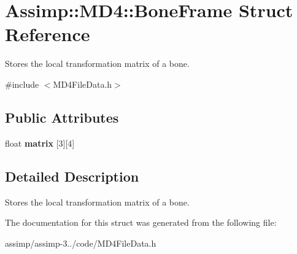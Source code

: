 \hypertarget{struct_assimp_1_1_m_d4_1_1_bone_frame}{\section{Assimp\+:\+:M\+D4\+:\+:Bone\+Frame Struct Reference}
\label{struct_assimp_1_1_m_d4_1_1_bone_frame}
}


Stores the local transformation matrix of a bone.  




{\ttfamily \#include $<$M\+D4\+File\+Data.\+h$>$}

\subsection*{Public Attributes}
\begin{DoxyCompactItemize}
\item 
\hypertarget{struct_assimp_1_1_m_d4_1_1_bone_frame_a5f487e73048c3095cb730a6d9501592e}{float {\bfseries matrix} \mbox{[}3\mbox{]}\mbox{[}4\mbox{]}}\label{struct_assimp_1_1_m_d4_1_1_bone_frame_a5f487e73048c3095cb730a6d9501592e}

\end{DoxyCompactItemize}


\subsection{Detailed Description}
Stores the local transformation matrix of a bone. 

The documentation for this struct was generated from the following file\+:\begin{DoxyCompactItemize}
\item 
assimp/assimp-\/3../code/M\+D4\+File\+Data.\+h\end{DoxyCompactItemize}
